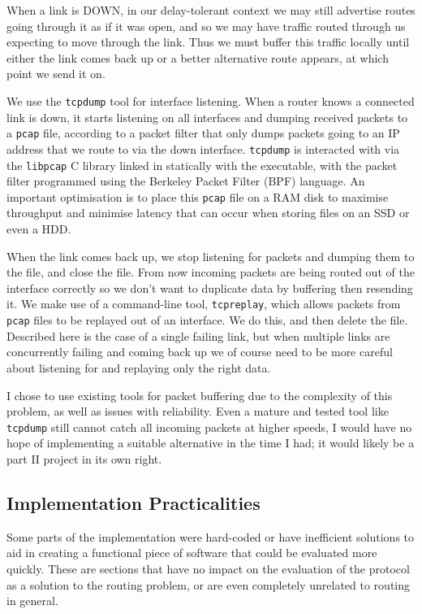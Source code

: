 \documentclass[10pt,twoside,a4paper]{article}
\begin{document}
When a link is DOWN, in our delay-tolerant context we may still advertise routes going through it as if it was open, and so we may have traffic routed through us expecting to move through the link. Thus we must buffer this traffic locally until either the link comes back up or a better alternative route appears, at which point we send it on.

We use the \texttt{tcpdump} tool for interface listening. When a router knows a connected link is down, it starts listening on all interfaces and dumping received packets to a \texttt{pcap} file, according to a packet filter that only dumps packets going to an IP address that we route to via the down interface. \texttt{tcpdump} is interacted with via the \texttt{libpcap} C library linked in statically with the executable, with the packet filter programmed using the Berkeley Packet Filter (BPF) language. An important optimisation is to place this \texttt{pcap} file on a RAM disk to maximise throughput and minimise latency that can occur when storing files on an SSD or even a HDD.

When the link comes back up, we stop listening for packets and dumping them to the file, and close the file. From now incoming packets are being routed out of the interface correctly so we don't want to duplicate data by buffering then resending it. We make use of a command-line tool, \texttt{tcpreplay}, which allows packets from \texttt{pcap} files to be replayed out of  an interface. We do this, and then delete the file. Described here is the case of a single failing link, but when multiple links are concurrently failing and coming back up we of course need to be more careful about listening for and replaying only the right data.

I chose to use existing tools for packet buffering due to the complexity of this problem, as well as issues with reliability. Even a mature and tested tool like \texttt{tcpdump} still cannot catch all incoming packets at higher speeds, I would have no hope of implementing a suitable alternative in the time I had; it would likely be a part II project in its own right.

\subsection{Implementation Practicalities}

Some parts of the implementation were hard-coded or have inefficient solutions to aid in creating a functional piece of software that could be evaluated more quickly. These are sections that have no impact on the evaluation of the protocol as a solution to the routing problem, or are even completely unrelated to routing in general.
\end{document}
